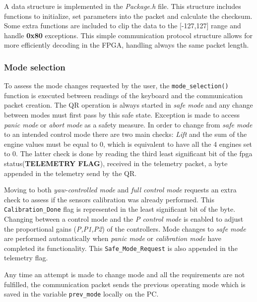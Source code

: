 \documentclass{article}
\begin{document}
A data structure is implemented in the \emph{Package.h} file. This structure includes functions to initialize, set parameters into the packet and calculate the checksum. Some extra functions are included to clip the data to the [-127,127] range and handle \textbf{0x80} exceptions. This simple communication protocol structure allows for more efficiently decoding in the FPGA, handling always the same packet length.


\subsubsection{Mode selection}
\label{sec:modeselection}
To assess the mode changes requested by the user, the \texttt{mode\_selection()} function is executed between readings of the keyboard and the communication packet creation. The QR operation is always started in \textit{safe mode} and any change between modes must first pass by this safe state. Exception is made to access \textit{panic mode} or \textit{abort mode} as a safety measure. In order to change from \textit{safe mode} to an intended control mode there are two main checks: \textit{Lift} and the sum of the engine values must be equal to $0$, which is equivalent to have all the 4 engines set to $0$. The latter check is done by reading the third least significant bit of the fpga status(\textbf{TELEMETRY FLAG}), received in the telemetry packet, a byte appended in the telemetry send by the QR. 

Moving to both \textit{yaw-controlled mode} and \textit{full control mode} requests an extra check to assess if the sensors calibration was already performed. This \texttt{Calibration\_Done} flag is represented in the least significant bit of the byte. Changing between a control mode and the \textit{P control mode} is enabled to adjust the proportional gains (\textit{P,P1,P2}) of the controllers. Mode changes to \textit{safe mode} are performed automatically when \textit{panic mode} or \textit{calibration mode} have completed its functionality. This \texttt{Safe\_Mode\_Request} is also appended in the telemetry flag. 

Any time an attempt is made to change mode and all the requirements are not fulfilled, the communication packet sends the previous operating mode which is saved in the variable \texttt{prev\_mode} locally on the PC.
\end{document}
